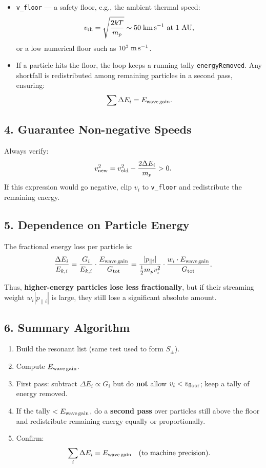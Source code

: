 \begin{itemize}
    \item \texttt{v\_floor} — a safety floor, e.g., the ambient thermal speed:
    \[
    v_{\rm th} = \sqrt{\frac{2kT}{m_p}} \sim 50\;{\rm km\,s^{-1}} \text{ at 1~AU},
    \]
    or a low numerical floor such as $10^3\;{\rm m\,s^{-1}}$.
    \item If a particle hits the floor, the loop keeps a running tally \texttt{energyRemoved}. Any shortfall is redistributed among remaining particles in a second pass, ensuring:
    \[
    \sum \Delta E_i = E_{\rm wave\,gain}.
    \]
\end{itemize}

\subsection*{4. Guarantee Non-negative Speeds}

Always verify:
\[
v^2_{\rm new} = v^2_{\rm old} - \frac{2\Delta E_i}{m_p} > 0.
\]
If this expression would go negative, clip $v_i$ to \texttt{v\_floor} and redistribute the remaining energy.

\subsection*{5. Dependence on Particle Energy}

The fractional energy loss per particle is:
\[
\frac{\Delta E_i}{E_{k,i}}
= \frac{G_i}{E_{k,i}} \cdot \frac{E_{\rm wave\,gain}}{G_{\rm tot}}
= \frac{|p_{\parallel i}|}{\frac{1}{2} m_p v_i^2}
  \cdot \frac{w_i \cdot E_{\rm wave\,gain}}{G_{\rm tot}}.
\]

Thus, \textbf{higher-energy particles lose less fractionally}, but if their streaming weight $w_i |p_{\parallel i}|$ is large, they still lose a significant absolute amount.

\subsection*{6. Summary Algorithm}

\begin{enumerate}
    \item Build the resonant list (same test used to form $S_\pm$).
    \item Compute $E_{\rm wave\,gain}$.
    \item First pass: subtract $\Delta E_i \propto G_i$ but do \textbf{not} allow $v_i < v_{\rm floor}$; keep a tally of energy removed.
    \item If the tally $< E_{\rm wave\,gain}$, do a \textbf{second pass} over particles still above the floor and redistribute remaining energy equally or proportionally.
    \item Confirm:
    \[
    \sum_i \Delta E_i = E_{\rm wave\,gain} \quad \text{(to machine precision)}.
    \]
\end{enumerate}

